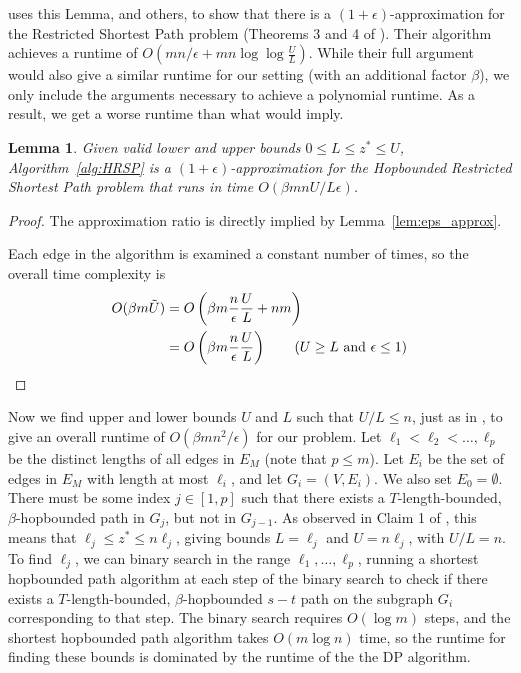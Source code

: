 \documentclass{article}
\newtheorem{lemma}[theorem]{Lemma}
\theoremstyle{definition}
\theoremstyle{remark}
\begin{document}
\cite{LR01} uses this Lemma, and others, to show that there is a $(1+\epsilon)$-approximation for the Restricted Shortest Path problem (Theorems 3 and 4 of \cite{LR01}). Their algorithm achieves a runtime of $O(m n/ \epsilon + m n \log \log \frac{U}{L})$. While their full argument would also give a similar runtime for our setting (with an additional factor $\beta$), we only include the arguments necessary to achieve a polynomial runtime. As a result, we get a worse runtime than what \cite{LR01} would imply. 

\begin{lemma} \label{lem:AS}
    Given valid lower and upper bounds $0 \leq L \leq z^* \leq U$, Algorithm~\ref{alg:HRSP} is a $(1+\epsilon)$-approximation for the Hopbounded Restricted Shortest Path problem that runs in time $O(\beta m n U / L \epsilon)$. 
\end{lemma}
\begin{proof}
The approximation ratio is directly implied by Lemma~\ref{lem:eps_approx}. 
    
Each edge in the algorithm is examined a constant number of times, so the overall time complexity is 
\begin{align*}
    O(\beta m \Tilde{U}) &= O\left( \beta m \frac{n}{\epsilon} \frac{U}{L} + nm \right) \\
    &= O\left( \beta m \frac{n}{\epsilon} \frac{U}{L}  \right) \tag{$U \geq L$ and $\epsilon \leq 1$}
\end{align*}
\end{proof}

Now we find upper and lower bounds $U$ and $L$ such that $U/L \leq n$, just as in \cite{LR01}, to give an overall runtime of $O(\beta m n^2 / \epsilon)$ for our problem. Let $\ell_1 < \ell_2 < \dots, \ell_p$ be the distinct lengths of all edges in $E_M$ (note that $p \leq m$). Let $E_i$ be the set of edges in $E_M$ with length at most $\ell_i$, and let $G_i = (V, E_i)$. We also set $E_0 = \emptyset$.
There must be some index $j \in [1,p]$ such that there exists a $T$-length-bounded, $\beta$-hopbounded path in $G_j$, but not in $G_{j-1}$. As observed in Claim 1 of \cite{LR01}, this means that $\ell_j \leq z^* \leq n \ell_j$, giving bounds $L = \ell_j$ and $U = n \ell_j$, with $U/L = n$. To find $\ell_j$, we can binary search in the range $\ell_1, \dots, \ell_p$, running a shortest hopbounded path algorithm at each step of the binary search to check if there exists a $T$-length-bounded, $\beta$-hopbounded $s-t$ path on the subgraph $G_i$ corresponding to that step. The binary search requires $O(\log m)$ steps, and the shortest hopbounded path algorithm takes $O(m \log n)$ time, so the runtime for finding these bounds is dominated by the runtime of the the DP algorithm. 
\end{document}
